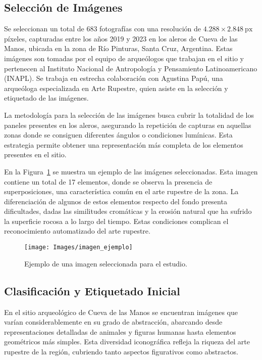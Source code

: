 \subsection{Selección de Imágenes}
Se seleccionan un total de 683 fotografías con una resolución de \(4.288 \times 2.848\ \text{px}\) píxeles, capturadas entre los años 2019 y 2023 en los aleros de Cueva de las Manos, ubicada en la zona de Río Pinturas, Santa Cruz, Argentina.
Estas imágenes son tomadas por el equipo de arqueólogos que trabajan en el sitio y pertenecen al Instituto Nacional de Antropología y Pensamiento Latinoamericano (INAPL).
Se trabaja en estrecha colaboración con Agustina Papú, una arqueóloga especializada en Arte Rupestre, quien asiste en la selección y etiquetado de las imágenes.

La metodología para la selección de las imágenes busca cubrir la totalidad de los paneles presentes en los aleros, asegurando la repetición de capturas en aquellas zonas donde se consiguen diferentes ángulos o condiciones lumínicas.
Esta estrategia permite obtener una representación más completa de los elementos presentes en el sitio.

En la Figura~\ref{fig:imagen_ejemplo} se muestra un ejemplo de las imágenes seleccionadas. Esta imagen contiene un total de 17 elementos, donde se observa la presencia de superposiciones, una característica común en el arte rupestre de la zona.
La diferenciación de algunos de estos elementos respecto del fondo presenta dificultades, dadas las similitudes cromáticas y la erosión natural que ha sufrido la superficie rocosa a lo largo del tiempo.
Estas condiciones complican el reconocimiento automatizado del arte rupestre.

\begin{figure}[ht!]
    \centering
    \texttt{[image: Images/imagen\_ejemplo]}
    \caption{Ejemplo de una imagen seleccionada para el estudio.}
    \label{fig:imagen_ejemplo}
\end{figure}

\subsection{Clasificación y Etiquetado Inicial}

En el sitio arqueológico de Cueva de las Manos se encuentran imágenes que varían considerablemente en su grado de abstracción, abarcando desde representaciones detalladas de animales y figuras humanas hasta elementos geométricos más simples.
Esta diversidad iconográfica refleja la riqueza del arte rupestre de la región, cubriendo tanto aspectos figurativos como abstractos.

